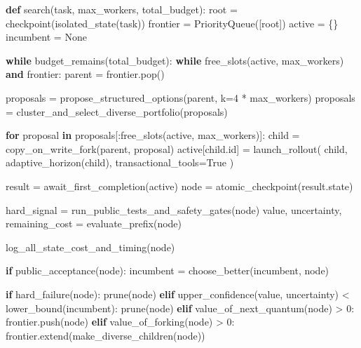 \documentclass[
  letterpaper,
]{article}
\newenvironment{Shaded}{}{}
\newcommand{\BuiltInTok}[1]{\textcolor[rgb]{0.00,0.50,0.00}{#1}}
\newcommand{\ControlFlowTok}[1]{\textcolor[rgb]{0.00,0.44,0.13}{\textbf{#1}}}
\newcommand{\DecValTok}[1]{\textcolor[rgb]{0.25,0.63,0.44}{#1}}
\newcommand{\KeywordTok}[1]{\textcolor[rgb]{0.00,0.44,0.13}{\textbf{#1}}}
\newcommand{\NormalTok}[1]{#1}
\newcommand{\OperatorTok}[1]{\textcolor[rgb]{0.40,0.40,0.40}{#1}}
\newcommand{\VariableTok}[1]{\textcolor[rgb]{0.10,0.09,0.49}{#1}}
\begin{document}
\begin{Shaded}
\begin{Highlighting}[]
\KeywordTok{def}\NormalTok{ search(task, max\_workers, total\_budget):}
\NormalTok{    root }\OperatorTok{=}\NormalTok{ checkpoint(isolated\_state(task))}
\NormalTok{    frontier }\OperatorTok{=}\NormalTok{ PriorityQueue([root])}
\NormalTok{    active }\OperatorTok{=}\NormalTok{ \{\}}
\NormalTok{    incumbent }\OperatorTok{=} \VariableTok{None}

    \ControlFlowTok{while}\NormalTok{ budget\_remains(total\_budget):}
        \ControlFlowTok{while}\NormalTok{ free\_slots(active, max\_workers) }\KeywordTok{and}\NormalTok{ frontier:}
\NormalTok{            parent }\OperatorTok{=}\NormalTok{ frontier.pop()}

\NormalTok{            proposals }\OperatorTok{=}\NormalTok{ propose\_structured\_options(parent, k}\OperatorTok{=}\DecValTok{4} \OperatorTok{*}\NormalTok{ max\_workers)}
\NormalTok{            proposals }\OperatorTok{=}\NormalTok{ cluster\_and\_select\_diverse\_portfolio(proposals)}

            \ControlFlowTok{for}\NormalTok{ proposal }\KeywordTok{in}\NormalTok{ proposals[:free\_slots(active, max\_workers)]:}
\NormalTok{                child }\OperatorTok{=}\NormalTok{ copy\_on\_write\_fork(parent, proposal)}
\NormalTok{                active[child.}\BuiltInTok{id}\NormalTok{] }\OperatorTok{=}\NormalTok{ launch\_rollout(}
\NormalTok{                    child,}
\NormalTok{                    adaptive\_horizon(child),}
\NormalTok{                    transactional\_tools}\OperatorTok{=}\VariableTok{True}
\NormalTok{                )}

\NormalTok{        result }\OperatorTok{=}\NormalTok{ await\_first\_completion(active)}
\NormalTok{        node }\OperatorTok{=}\NormalTok{ atomic\_checkpoint(result.state)}

\NormalTok{        hard\_signal }\OperatorTok{=}\NormalTok{ run\_public\_tests\_and\_safety\_gates(node)}
\NormalTok{        value, uncertainty, remaining\_cost }\OperatorTok{=}\NormalTok{ evaluate\_prefix(node)}

\NormalTok{        log\_all\_state\_cost\_and\_timing(node)}

        \ControlFlowTok{if}\NormalTok{ public\_acceptance(node):}
\NormalTok{            incumbent }\OperatorTok{=}\NormalTok{ choose\_better(incumbent, node)}

        \ControlFlowTok{if}\NormalTok{ hard\_failure(node):}
\NormalTok{            prune(node)}
        \ControlFlowTok{elif}\NormalTok{ upper\_confidence(value, uncertainty) }\OperatorTok{\textless{}}\NormalTok{ lower\_bound(incumbent):}
\NormalTok{            prune(node)}
        \ControlFlowTok{elif}\NormalTok{ value\_of\_next\_quantum(node) }\OperatorTok{\textgreater{}} \DecValTok{0}\NormalTok{:}
\NormalTok{            frontier.push(node)}
        \ControlFlowTok{elif}\NormalTok{ value\_of\_forking(node) }\OperatorTok{\textgreater{}} \DecValTok{0}\NormalTok{:}
\NormalTok{            frontier.extend(make\_diverse\_children(node))}


\end{Highlighting}
\end{Shaded}
\end{document}
